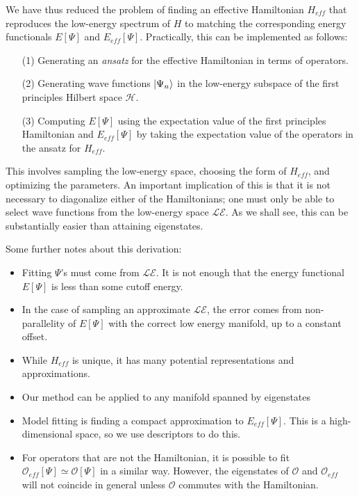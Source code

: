 We have thus reduced the problem of finding an effective Hamiltonian $H_{eff}$ that reproduces the low-energy spectrum of $H$ to matching the corresponding energy functionals $E[\Psi]$ and $E_{eff}[\Psi]$. 
Practically, this can be implemented as follows: 
\begin{itemize}
\item [(1)]Generating an \textit{ansatz} for the effective Hamiltonian in terms of operators. 
\item [(2)]Generating wave functions $\ket{\Psi_n}$ in the low-energy subspace of the first principles Hilbert space ${\mathcal H}$.
\item [(3)]Computing $E[\Psi]$ using the expectation value of the first principles Hamiltonian and $E_{eff}[\Psi]$ by taking the expectation value of the operators in the ansatz for $H_{eff}$. 
\end{itemize}
This involves sampling the low-energy space, choosing the form of $H_{eff}$, and optimizing the parameters.
An important implication of this is that it is not necessary to diagonalize either of the Hamiltonians; one must only be able to select wave functions from the low-energy space $\mathcal{LE}$.
As we shall see, this can be substantially easier than attaining eigenstates.

Some further notes about this derivation:
\begin{itemize}
\item Fitting $\Psi$'s must come from $\mathcal{LE}$. It is not enough that the energy functional $E[\Psi]$ is less than some cutoff energy.
\item In the case of sampling an approximate $\mathcal{LE}$, the error comes from non-parallelity of $E[\Psi]$ with the correct low energy manifold, up to a constant offset.
\item While $H_{eff}$ is unique, it has many potential representations and approximations. 
\item Our method can be applied to any manifold spanned by eigenstates
\item Model fitting is finding a compact approximation to $E_{eff}[\Psi]$. This is a high-dimensional space, so we use descriptors to do this.	
\item For operators that are not the Hamiltonian, it is possible to fit $\mathcal{O}_{eff}[\Psi] \simeq {\mathcal O}[\Psi]$ in a similar way. However, the eigenstates of ${\mathcal O}$ and ${\mathcal O}_{eff}$ will not coincide in general unless $\mathcal{O}$ commutes with the Hamiltonian.
\end{itemize}


